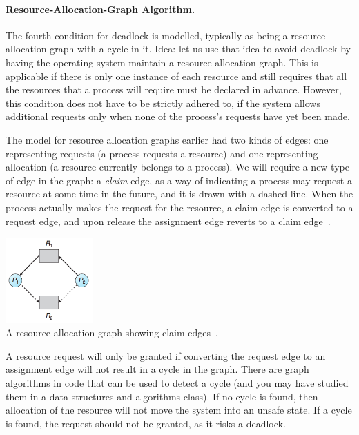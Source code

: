 \paragraph{Resource-Allocation-Graph Algorithm.} The fourth condition for deadlock is modelled, typically as being a resource allocation graph with a cycle in it. Idea: let us use that idea to avoid deadlock by having the operating system maintain a resource allocation graph. This is applicable if there is only one instance of each resource and still requires that all the resources that a process will require must be declared in advance. However, this condition does not have to be strictly adhered to, if the system allows additional requests only when none of the process's requests have yet been made.

The model for resource allocation graphs earlier had two kinds of edges: one representing requests (a process requests a resource) and one representing allocation (a resource currently belongs to a process). We will require a new type of edge in the graph: a \textit{claim} edge, as a way of indicating a process may request a resource at some time in the future, and it is drawn with a dashed line. When the process actually makes the request for the resource, a claim edge is converted to a request edge, and upon release the assignment edge reverts to a claim edge~\cite{osc}.

\begin{center}
\includegraphics[width=0.25\textwidth]{images/resource-allocation-graph-claim.png}\\
A resource allocation graph showing claim edges~\cite{osc}.
\end{center}

A resource request will only be granted if converting the request edge to an assignment edge will not result in a cycle in the graph. There are graph algorithms in code that can be used to detect a cycle (and you may have studied them in a data structures and algorithms class). If no cycle is found, then allocation of the resource will not move the system into an unsafe state. If a cycle is found, the request should not be granted, as it risks a deadlock.


